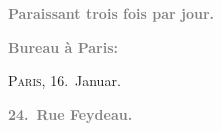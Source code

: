\pstart
           \begin{otherlanguage}{french}\textcolor{gray}{\textbf{\textbf{Paraissant trois fois par jour.}}}\end{otherlanguage}\pend
           
\pstart
           \begin{otherlanguage}{french}\textcolor{gray}{\textbf{\textbf{Bureau à Paris:}}}\end{otherlanguage}\hfill \textsc{Paris}, 16. Januar.\pend
           
\pstart
           \begin{otherlanguage}{french}\textcolor{gray}{\textbf{\textbf{24. Rue Feydeau.}}}\end{otherlanguage}\pend
           
